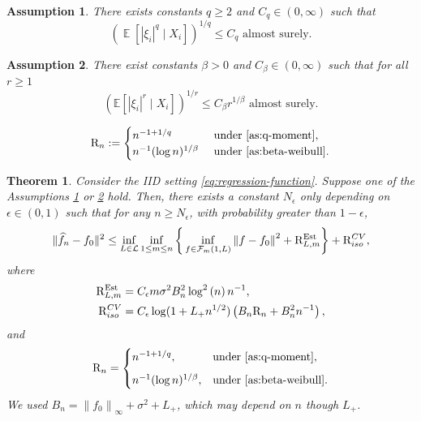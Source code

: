 \documentclass[10pt,a4paper]{amsart}
\newtheorem{assumption}{Assumption}
\newtheorem{theorem}{Theorem}
\DeclareMathOperator*{\E}{\mathbb{E}}
\begin{document}
\begin{assumption}\label{as:q-moment}
    There exists constants $q \geq 2$ and $C_q \in (0,\infty)$ such that 
    \begin{equation*}
        \left(\E[|\xi_i|^q\mid X_i]\right)^{1/q}\le C_q \text{ almost surely}.
    \end{equation*}
\end{assumption}

\begin{assumption}\label{as:beta-weibull}
    There exist constants $\beta>0$ and $C_\beta \in(0, \infty)$ such that for all $r \geq 1$
    \begin{equation*}
\left(\mathbb{E}\left[|\xi_i|^r\mid X_i\right]\right)^{1 / r} \leq C_\beta r^{1 / \beta}\text{ almost surely}.
\end{equation*}
\end{assumption}

    \begin{align}\label{eq:rate_under_LSE}
    	\mathrm{R}_n := \begin{cases}
    		n^{-1+1/q} &\text{ under }\Cref{as:q-moment},\\
    		n^{-1}(\log n)^{1/\beta} &\text{ under }\Cref{as:beta-weibull}.
    	\end{cases}
    \end{align}

\begin{theorem}\label{th: general_isotonic}
Consider the IID setting \eqref{eq:regression-function}.
Suppose one of the Assumptions \ref{as:q-moment} or \ref{as:beta-weibull} hold. Then, there exists a constant $N_\epsilon$ only depending on $\epsilon\in(0,1)$ such that for any $n \ge N_\epsilon$, with probability greater than $1-\epsilon$,
\begin{equation*}
\begin{aligned}
\|\widehat{f}_n-f_0\|^2  \leq \inf _{L \in \mathcal{L}}\inf _{1 \leq m \leq n}\left\{ \, \inf _{f \in \mathcal{F}_m(1, L)}\left\|f-f_0\right\|^2+ 
\mathrm{R}_{L,m}^{\mathrm{Est}}\right\} +\mathrm{R}^{\rm CV}_{\rm iso},
\end{aligned}
\end{equation*}
where
\begin{equation*}
    \begin{aligned}
\mathrm{R}_{L,m}^{\mathrm{Est}}& =C_\epsilon m \sigma^2 B_n^2 \log ^2\left(n \right)n^{-1},\\
        \mathrm{R}^{\rm CV}_{\rm iso}
 & =  C_\epsilon \log (1+ L_{+} n^{1 / 2})\left( B_n\mathrm{R}_n + B_n^2n^{-1} \right), 
 \end{aligned}
 \end{equation*}
 and
\begin{equation*}
\mathrm{R}_n =
\begin{cases}
   n^{-1+1/q}, & \text{under } \Cref{as:q-moment}, \\[6pt]
   n^{-1} (\log n)^{1/\beta}, & \text{under } \Cref{as:beta-weibull}.
\end{cases}
\end{equation*}
We used $B_n=\left\|f_0\right\|_{\infty}+\sigma^2+L_{+}$, which may depend on $n$ though $L_+$.
\end{theorem}
\end{document}
